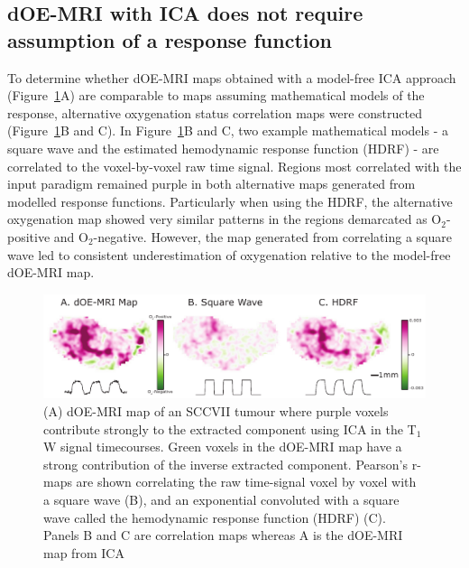 \subsection{dOE-MRI with \ac{ICA} does not require assumption of a response function}
To determine whether \ac{dOE-MRI} maps obtained with a model-free \ac{ICA} approach (Figure~\ref{fig_correlation}A) are comparable to maps assuming mathematical models of the response, alternative oxygenation status correlation maps were constructed (Figure~\ref{fig_correlation}B and C). 
In Figure~\ref{fig_correlation}B and C, two example mathematical models - a square wave and the estimated hemodynamic response function (HDRF) - are correlated to the voxel-by-voxel raw time signal. 
Regions most correlated with the input paradigm remained purple in both alternative maps generated from modelled response functions.
Particularly when using the HDRF, the alternative oxygenation map showed very similar patterns in the regions demarcated as O$_2$-positive and O$_2$-negative. 
However, the map generated from correlating a square wave led to consistent underestimation of oxygenation relative to the model-free \ac{dOE-MRI} map.

\begin{figure}[htbp]
   \centering
   \includegraphics[width=\textwidth]{oemri_thesis1/oemri_thesis1-images/fig3_correlation.pdf} %
   \caption{(A) \ac{dOE-MRI} map of an SCCVII tumour where purple voxels contribute strongly to the extracted component using \ac{ICA} in the T$_1$W signal timecourses. 
Green voxels in the \ac{dOE-MRI} map have a strong contribution of the inverse extracted component. Pearson's r-maps are shown correlating the raw time-signal voxel by voxel with a square wave (B), and an exponential convoluted with a square wave called the hemodynamic response function (HDRF) (C).
Panels B and C are correlation maps whereas A is the \ac{dOE-MRI} map from \ac{ICA}
   \label{fig_correlation}}
\end{figure}

